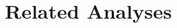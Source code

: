 \documentclass[output=paper]{langsci/langscibook}
\begin{document}

\section{Related Analyses}
\label{Sec-Previous}








\end{document}
